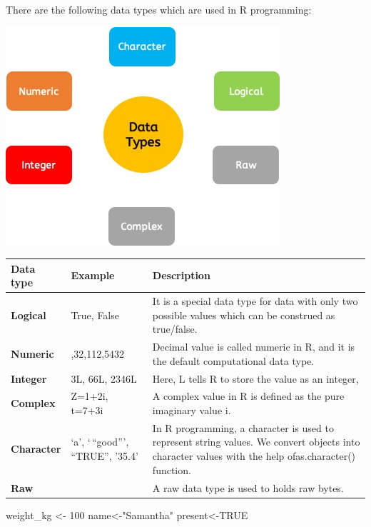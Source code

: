 \documentclass[
]{book}
\newenvironment{Shaded}{\begin{snugshade}}{\end{snugshade}}
\newcommand{\ConstantTok}[1]{\textcolor[rgb]{0.00,0.00,0.00}{#1}}
\newcommand{\DecValTok}[1]{\textcolor[rgb]{0.00,0.00,0.81}{#1}}
\newcommand{\NormalTok}[1]{#1}
\newcommand{\OtherTok}[1]{\textcolor[rgb]{0.56,0.35,0.01}{#1}}
\newcommand{\StringTok}[1]{\textcolor[rgb]{0.31,0.60,0.02}{#1}}
\begin{document}
There are the following data types which are used in R programming:

\includegraphics{datatypes.jpg}

\begin{longtable}[]{@{}
  >{\raggedright\arraybackslash}p{}
  >{\centering\arraybackslash}p{}
  >{\raggedleft\arraybackslash}p{}@{}}
\toprule
Data type & Example & Description \\
\midrule
\endhead
\textbf{Logical} & True, False & It is a special data type for data with only two possible values which can be construed as true/false. \\
\textbf{Numeric} & 12,32,112,5432 & Decimal value is called numeric in R, and it is the default computational data type. \\
\textbf{Integer} & 3L, 66L, 2346L & Here, L tells R to store the value as an integer, \\
\textbf{Complex} & Z=1+2i, t=7+3i & A complex value in R is defined as the pure imaginary value i. \\
\textbf{Character} & `a', `\,``good''', ``TRUE'', '35.4' & In R programming, a character is used to represent string values. We convert objects into character values with the help ofas.character() function. \\
\textbf{Raw} & & A raw data type is used to holds raw bytes. \\
\bottomrule
\end{longtable}

\begin{Shaded}
\begin{Highlighting}[]
\NormalTok{weight\_kg }\OtherTok{\textless{}{-}} \DecValTok{100}
\NormalTok{name}\OtherTok{\textless{}{-}}\StringTok{"Samantha"}
\NormalTok{present}\OtherTok{\textless{}{-}}\ConstantTok{TRUE}
\end{Highlighting}
\end{Shaded}
\end{document}
